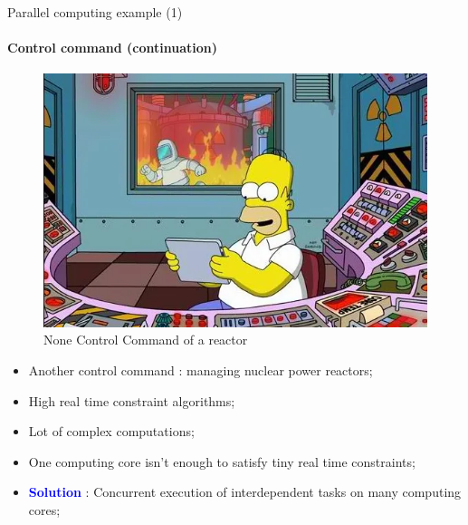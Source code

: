 \documentclass[compress,10pt,aspectratio=169]{beamer}
\begin{document}
\begin{frame}[fragile]{Parallel computing example (1)}
    \framesubtitle{Control command (continuation)}
    \small
    \begin{multicols}{2}
        \begin{figure}[h]      
            \includegraphics[width=\linewidth]{../Images/NuclearPlantSimpson.png}
            \caption{None Control Command of a reactor}
        \end{figure}
    \begin{itemize}
        \item Another control command : managing nuclear power reactors;
        \item High real time constraint algorithms;
        \item Lot of complex computations;
        \item One computing core isn't enough to satisfy tiny real time constraints;
        \item \textcolor{blue}{\bf Solution} : Concurrent execution of interdependent tasks on many computing cores; 
    \end{itemize}
\end{multicols}
\end{frame}
\end{document}
